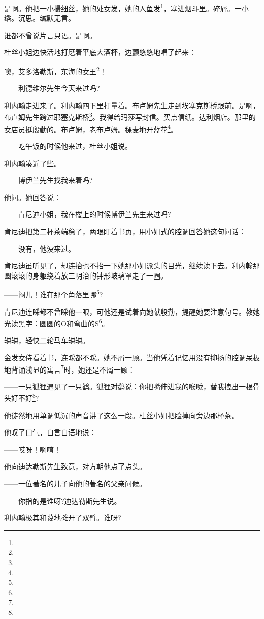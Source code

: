 \par 是啊。他把一小撮细丝，她的处女发，她的人鱼发\footnote{}，塞进烟斗里。碎屑。一小绺。沉思。缄默无言。
\par 谁都不曾说片言只语。是啊。
\par 杜丝小姐边快活地打磨着平底大酒杯，边颤悠悠地唱了起来：
\par 噢，艾多洛勒斯，东海的女王\footnote{}！
\par ——利德维尔先生今天来过吗?
\par 利内翰走进来了。利内翰四下里打量着。布卢姆先生走到埃塞克斯桥跟前。是啊，布卢姆先生跨过耶塞克斯桥\footnote{}。我得给玛莎写封信。买点信纸。达利烟店。那里的女店员挺殷勤的。布卢姆，老布卢姆。稞麦地开蓝花\footnote{}。
\par ——吃午饭的时候他来过，杜丝小姐说。
\par 利内翰凑近了些。
\par ——博伊兰先生找我来着吗?
\par 他问。她回答说：
\par ——肯尼迪小姐，我在楼上的时候博伊兰先生来过吗?
\par 肯尼迪把第二杯茶端稳了，两眼盯着书页，用小姐式的腔调回答她这句问话：
\par ——没有，他没来过。
\par 肯尼迪虽听见了，却连抬也不抬一下她那小姐派头的目光，继续读下去。利内翰那圆滚滚的身躯绕着放三明治的钟形玻璃罩走了一圈。
\par ——闷儿！谁在那个角落里哪\footnote{}?
\par 肯尼迪连睬都不曾睬他一眼，可他还是试着向她献殷勤，提醒她要注意句号。教她光读黑字：圆圆的O和弯曲的S\footnote{}。
\par 辚辚，轻快二轮马车辚辚。
\par 金发女侍看着书，连睬都不睬。她不屑一顾。当他凭着记忆用没有抑扬的腔调呆板地背诵浅显的寓言\footnote{}时，她还是不屑一顾：
\par ——一只狐狸遇见了一只鹳。狐狸对鹳说：你把嘴伸进我的喉咙，替我拽出一根骨头好不好\footnote{}?
\par 他徒然地用单调低沉的声音讲了这么一段。杜丝小姐把脸掉向旁边那杯茶。
\par 他叹了口气，自言自语地说：
\par ——哎呀！啊唷！
\par 他向迪达勒斯先生致意，对方朝他点了点头。
\par ——一位著名的儿子向他的著名的父亲问候。
\par ——你指的是谁呀?迪达勒斯先生说。
\par 利内翰极其和蔼地摊开了双臂。谁呀?
